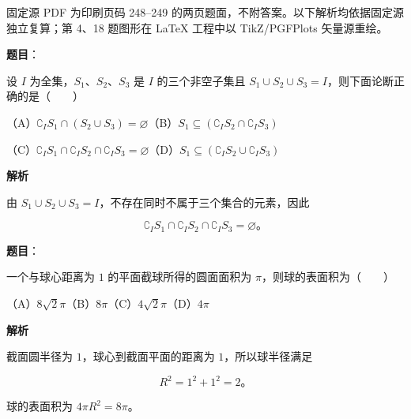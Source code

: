 

\begin{gktip}
固定源 PDF 为印刷页码 248–249 的两页题面，不附答案。以下解析均依据固定源独立复算；第 4、18 题图形在 LaTeX 工程中以 TikZ/PGFPlots 矢量源重绘。
\end{gktip}

\begin{answer}

\textbf{题目}：

设 $I$ 为全集，$S_1\text{、}S_2\text{、}S_3$ 是 $I$ 的三个非空子集且 $S_1\cup S_2\cup S_3=I$，则下面论断正确的是\mbox{（　　）}

（A）$\complement_I S_1\cap(S_2\cup S_3)=\varnothing$\quad（B）$S_1\subseteq(\complement_I S_2\cap\complement_I S_3)$

（C）$\complement_I S_1\cap\complement_I S_2\cap\complement_I S_3=\varnothing$\quad（D）$S_1\subseteq(\complement_I S_2\cup\complement_I S_3)$

\textbf{解析}

由 $S_1\cup S_2\cup S_3=I$，不存在同时不属于三个集合的元素，因此

\nopagebreak[4]
\[
\complement_I S_1\cap\complement_I S_2\cap\complement_I S_3=\varnothing\text{。}
\]


\end{answer}
\begin{answer}

\textbf{题目}：

一个与球心距离为 $1$ 的平面截球所得的圆面面积为 $\pi$，则球的表面积为\mbox{（　　）}

（A）$8\sqrt2\pi$\quad（B）$8\pi$\quad（C）$4\sqrt2\pi$\quad（D）$4\pi$

\textbf{解析}

截面圆半径为 $1$，球心到截面平面的距离为 $1$，所以球半径满足

\nopagebreak[4]
\[
R^2=1^2+1^2=2\text{。}
\]

球的表面积为 $4\pi R^2=8\pi$。


\end{answer}
